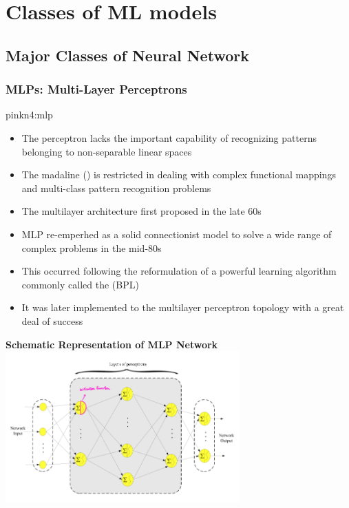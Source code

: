 \documentclass{tron}
\begin{document}
\newpage
\chapter{Classes of \Gls{ML} models}
\section{Major Classes of Neural Network}
\subsection{MLPs: Multi-Layer Perceptrons}
\begin{note}[Background]{pink}{n4:mlp}
\begin{itemize}
	\item The perceptron lacks the important capability of recognizing patterns belonging to non-separable linear spaces
	\item The madaline () is restricted in dealing with complex functional mappings and multi-class pattern recognition problems
	\item The multilayer architecture first proposed in the late 60s
	\item MLP re-emperhed as a solid connectionist model to solve a wide range of complex problems in the mid-80s
	\item This occurred following the reformulation of a powerful learning algorithm commonly called the  (\Gls{BPL})
	\item It was later implemented to the multilayer perceptron topology with a great deal of success
\end{itemize}

	\textbf{Schematic Representation of MLP Network}\\
	\includegraphics[width=340px]{Figs/Lec5/MLP_schematics}
\end{note}
\end{document}
